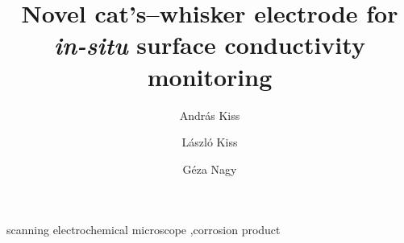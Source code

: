 \documentclass[3p]{elsarticle}
\begin{document}
\begin{frontmatter}

\title{Novel cat's--whisker electrode for \emph{in-situ} surface conductivity monitoring}
\author[akiss]{Andr\'{a}s Kiss}
\address[akiss, gnagy]{Department of General and Physical Chemistry, Faculty of Sciences, University of P\'{e}cs, 7624 P\'{e}cs, Ifj\'{u}s\'{a}g \'{u}tja 6, Hungary}
\address[akiss, gnagy]{J\'{a}nos Szent\'{a}gothai Research Centre, University of P\'{e}cs, 7624 P\'{e}cs, Ifj\'{u}s\'{a}g \'{u}tja 20, Hungary}
\author[lkiss]{L\'{a}szl\'{o} Kiss}
\author[gnagy]{G\'{e}za Nagy}

\begin{abstract}
\end{abstract}

\begin{keyword}
	scanning electrochemical microscope \sep corrosion product
\end{keyword}
\end{frontmatter}
\end{document}
